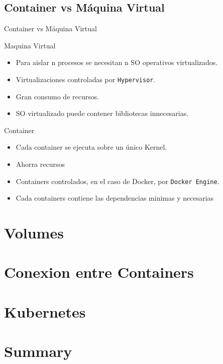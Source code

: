 \documentclass{beamer}
\begin{document}
\subsection{Container vs Máquina Virtual}

\begin{frame}{Container vs Máquina Virtual}

	Maquina Virtual
	\begin{itemize}
	\item
	Para aislar n procesos se necesitan n SO operativos virtualizados.
	\item
	Virtualizaciones controladas por \texttt{Hypervisor}.
	\item 
	Gran consumo de recursos.
	\item
	SO virtualizado puede contener bibliotecas innecesarias.
	\end{itemize}		

	Container
	\begin{itemize}
	\item
	Cada container se ejecuta sobre un único Kernel.
	\item
	Ahorra recursos
	\item
	Containers controlados, en el caso de Docker, por \texttt{Docker Engine}.
	\item
	Cada containers contiene las dependencias minimas y necesarias
	\end{itemize}
\end{frame}

\section{Volumes}

\section{Conexion entre Containers}

\section{Kubernetes}


\section*{Summary}
\end{document}
